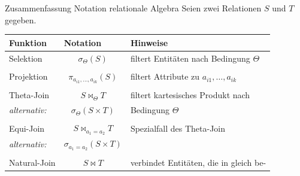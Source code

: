 \begin{bonus}{Zusammenfassung Notation relationale Algebra}
    Seien zwei Relationen $S$ und $T$ gegeben.

    \begin{center}
        \begin{tabular}{l|c|l}
            Funktion                        & \multicolumn{1}{l|}{Notation}                    & Hinweise                                      \\
            \hline
            Selektion                       & $\sigma_\Theta(S)$                               & filtert Entitäten nach Bedingung $\Theta$     \\
                                            &                                                  &                                               \\
            Projektion                      & $\pi_{a_{i1}, \ldots, a_{ik}}(S) $               & filtert Attribute zu $a_{i1}, \ldots, a_{ik}$ \\
                                            &                                                  &                                               \\
            Theta-Join                      & $S \bowtie_\Theta T$                             & filtert kartesisches Produkt nach             \\
            \hspace{4ex} \emph{alternativ:} & $\sigma_\Theta (S \times T)$                     & Bedingung $\Theta$                            \\
                                            &                                                  &                                               \\
            Equi-Join                       & $S \bowtie_{a_1 = a_2} T$                        & Spezialfall des Theta-Join                    \\
            \hspace{4ex} \emph{alternativ:} & $\sigma_{a_1 = a_2} (S \times T)$                &                                               \\
                                            &                                                  &                                               \\
            Natural-Join                    & $S \bowtie T$                                    & verbindet Entitäten, die in gleich be-        \\

\end{tabular}
\end{center}
\end{bonus}
